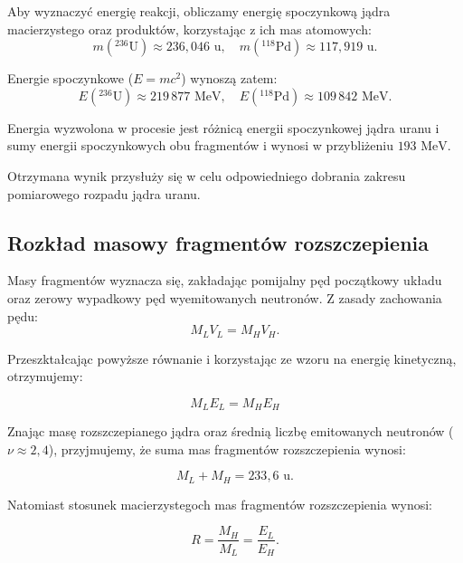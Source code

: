 \documentclass[a4paper,12pt]{article}
\begin{document}
Aby wyznaczyć energię reakcji, obliczamy energię spoczynkową jądra macierzystego oraz produktów, korzystając z ich mas atomowych: 
\begin{equation}
    m({}^{236}\text{U}) \approx 236{,}046 \text{ u},\quad m({}^{118}\text{Pd}) \approx 117{,}919 \text{ u}.
\end{equation}

Energie spoczynkowe ($E = mc^2$) wynoszą zatem:
\begin{equation}
E(^{236}\text{U}) \approx 219\,877 \text{ MeV},\quad E({}^{118}\text{Pd})  \approx 109\,842 \text{ MeV}.
\end{equation}

Energia wyzwolona w procesie jest różnicą energii spoczynkowej jądra uranu i sumy energii spoczynkowych obu fragmentów i wynosi w przybliżeniu $193 \text{ MeV}$.

Otrzymana wynik przysłuży się w celu odpowiedniego dobrania zakresu pomiarowego rozpadu jądra uranu.

\subsection{Rozkład masowy fragmentów rozszczepienia}

Masy fragmentów wyznacza się, zakładając pomijalny pęd początkowy układu oraz zerowy wypadkowy pęd wyemitowanych neutronów. Z zasady zachowania pędu:
\begin{equation}
M_L V_L = M_H V_H.
\end{equation}

Przeszktałcając powyższe równanie i korzystając ze wzoru na energię kinetyczną, otrzymujemy:

\begin{equation}
M_L E_L = M_H E_H
\end{equation}

Znając masę rozszczepianego jądra oraz średnią liczbę emitowanych neutronów ($\nu \approx 2{,}4$), przyjmujemy, że suma mas fragmentów rozszczepienia wynosi:

\begin{equation}
M_L + M_H = 233{,}6 \text{ u}.
\end{equation}

Natomiast stosunek macierzystegoch mas fragmentów rozszczepienia wynosi:

\begin{equation}
R = \frac{M_H}{M_L} = \frac{E_L}{E_H}.
\end{equation}
\end{document}
